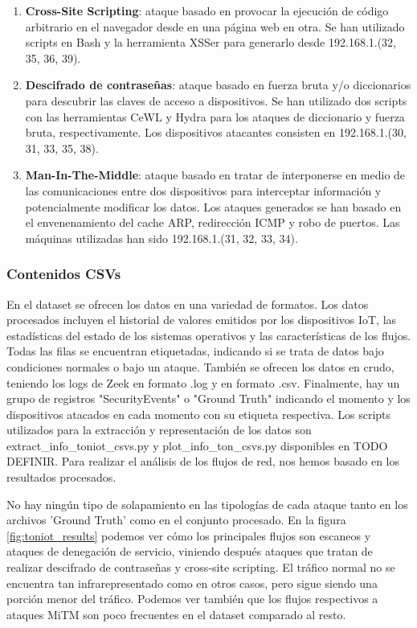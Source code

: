 \begin{enumerate}
  \item \textbf{Cross-Site Scripting}: ataque basado en provocar la ejecución de código arbitrario en el navegador desde en una página web en otra. Se han utilizado scripts en Bash y la herramienta XSSer para generarlo desde 192.168.1.(32, 35, 36, 39).
  \item \textbf{Descifrado de contraseñas}: ataque basado en fuerza bruta y/o diccionarios para descubrir las claves de acceso a dispositivos. Se han utilizado dos scripts con las herramientas CeWL y Hydra para los ataques de diccionario y fuerza bruta, respectivamente. Los dispositivos atacantes consisten en 192.168.1.(30, 31, 33, 35, 38).
  \item \textbf{Man-In-The-Middle}: ataque basado en tratar de interponerse en medio de las comunicaciones entre dos dispositivos para interceptar información y potencialmente modificar los datos. Los ataques generados se han basado en el envenenamiento del cache ARP, redirección ICMP y robo de puertos. Las máquinas utilizadas han sido 192.168.1.(31, 32, 33, 34).
\end{enumerate}

\subsubsection{Contenidos CSVs}

En el dataset se ofrecen los datos en una variedad de formatos. Los datos procesados incluyen el historial de valores emitidos por los dispositivos IoT, las estadísticas del estado de los sistemas operativos y las características de los flujos. Todas las filas se encuentran etiquetadas, indicando si se trata de datos bajo condiciones normales o bajo un ataque. También se ofrecen los datos en crudo, teniendo los logs de Zeek en formato .log y en formato .csv. Finalmente, hay un grupo de registros "SecurityEvents" o "Ground Truth" indicando el momento y los dispositivos atacados en cada momento con su etiqueta respectiva. Los scripts utilizados para la extracción y representación de los datos son extract\_info\_toniot\_csvs.py y plot\_info\_ton\_csvs.py disponibles en TODO DEFINIR. Para realizar el análisis de los flujos de red, nos hemos basado en los resultados procesados.

No hay ningún tipo de solapamiento en las tipologías de cada ataque tanto en los archivos 'Ground Truth' como en el conjunto procesado. En la figura \ref{fig:toniot_results} podemos ver cómo los principales flujos son escaneos y ataques de denegación de servicio, viniendo después ataques que tratan de realizar descifrado de contraseñas y cross-site scripting. El tráfico normal no se encuentra tan infrarepresentado como en otros casos, pero sigue siendo una porción menor del tráfico. Podemos ver también que los flujos respectivos a ataques MiTM son poco frecuentes en el dataset comparado al resto.

